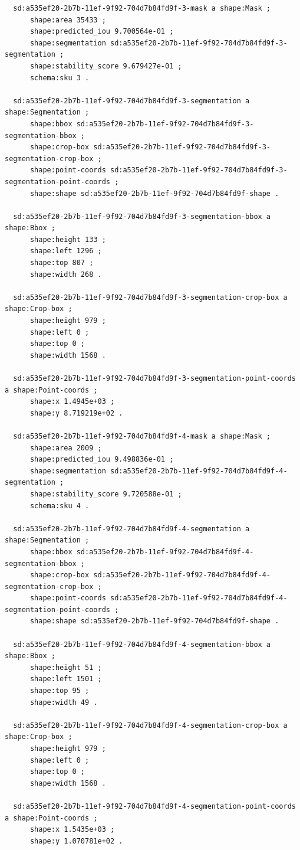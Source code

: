 \documentclass[732,14pt,final]{studrep}
\begin{document}
\begin{verbatim}
  sd:a535ef20-2b7b-11ef-9f92-704d7b84fd9f-3-mask a shape:Mask ;
      shape:area 35433 ;
      shape:predicted_iou 9.700564e-01 ;
      shape:segmentation sd:a535ef20-2b7b-11ef-9f92-704d7b84fd9f-3-segmentation ;
      shape:stability_score 9.679427e-01 ;
      schema:sku 3 .
  
  sd:a535ef20-2b7b-11ef-9f92-704d7b84fd9f-3-segmentation a shape:Segmentation ;
      shape:bbox sd:a535ef20-2b7b-11ef-9f92-704d7b84fd9f-3-segmentation-bbox ;
      shape:crop-box sd:a535ef20-2b7b-11ef-9f92-704d7b84fd9f-3-segmentation-crop-box ;
      shape:point-coords sd:a535ef20-2b7b-11ef-9f92-704d7b84fd9f-3-segmentation-point-coords ;
      shape:shape sd:a535ef20-2b7b-11ef-9f92-704d7b84fd9f-shape .
  
  sd:a535ef20-2b7b-11ef-9f92-704d7b84fd9f-3-segmentation-bbox a shape:Bbox ;
      shape:height 133 ;
      shape:left 1296 ;
      shape:top 807 ;
      shape:width 268 .
  
  sd:a535ef20-2b7b-11ef-9f92-704d7b84fd9f-3-segmentation-crop-box a shape:Crop-box ;
      shape:height 979 ;
      shape:left 0 ;
      shape:top 0 ;
      shape:width 1568 .
  
  sd:a535ef20-2b7b-11ef-9f92-704d7b84fd9f-3-segmentation-point-coords a shape:Point-coords ;
      shape:x 1.4945e+03 ;
      shape:y 8.719219e+02 .
  
  sd:a535ef20-2b7b-11ef-9f92-704d7b84fd9f-4-mask a shape:Mask ;
      shape:area 2009 ;
      shape:predicted_iou 9.498836e-01 ;
      shape:segmentation sd:a535ef20-2b7b-11ef-9f92-704d7b84fd9f-4-segmentation ;
      shape:stability_score 9.720588e-01 ;
      schema:sku 4 .
  
  sd:a535ef20-2b7b-11ef-9f92-704d7b84fd9f-4-segmentation a shape:Segmentation ;
      shape:bbox sd:a535ef20-2b7b-11ef-9f92-704d7b84fd9f-4-segmentation-bbox ;
      shape:crop-box sd:a535ef20-2b7b-11ef-9f92-704d7b84fd9f-4-segmentation-crop-box ;
      shape:point-coords sd:a535ef20-2b7b-11ef-9f92-704d7b84fd9f-4-segmentation-point-coords ;
      shape:shape sd:a535ef20-2b7b-11ef-9f92-704d7b84fd9f-shape .
  
  sd:a535ef20-2b7b-11ef-9f92-704d7b84fd9f-4-segmentation-bbox a shape:Bbox ;
      shape:height 51 ;
      shape:left 1501 ;
      shape:top 95 ;
      shape:width 49 .
  
  sd:a535ef20-2b7b-11ef-9f92-704d7b84fd9f-4-segmentation-crop-box a shape:Crop-box ;
      shape:height 979 ;
      shape:left 0 ;
      shape:top 0 ;
      shape:width 1568 .
  
  sd:a535ef20-2b7b-11ef-9f92-704d7b84fd9f-4-segmentation-point-coords a shape:Point-coords ;
      shape:x 1.5435e+03 ;
      shape:y 1.070781e+02 .
  

\end{verbatim}
\end{document}
